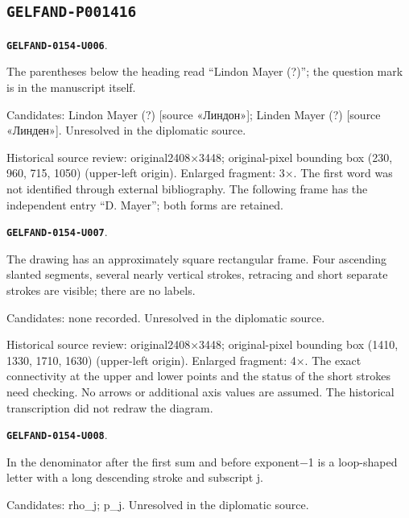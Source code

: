 \documentclass[11pt]{article}
\theoremstyle{definition}
\theoremstyle{remark}
\begin{document}
\subsection*{\texttt{GELFAND-P001416}}
\par\noindent\leavevmode{}\label{GELFAND-0154-U006}\label{GELFAND-P001416:mayer-name:note}\textbf{\texttt{GELFAND-0154-U006}}.\nopagebreak[4]\par
The parentheses below the heading read “Lindon Mayer (?)”; the question mark is in the manuscript itself.\par
Candidates: Lindon Mayer (?) [source «Линдон»]; Linden Mayer (?) [source «Линден»]. Unresolved in the diplomatic source.\par
Historical source review: original2408×3448; original-pixel bounding box (230, 960, 715, 1050) (upper-left origin). Enlarged fragment: 3×. The first word was not identified through external bibliography. The following frame has the independent entry “D. Mayer”; both forms are retained.\par\medskip
\par\noindent\leavevmode{}\label{GELFAND-0154-U007}\label{GELFAND-P001416:interval-graph:note}\textbf{\texttt{GELFAND-0154-U007}}.\nopagebreak[4]\par
The drawing has an approximately square rectangular frame. Four ascending slanted segments, several nearly vertical strokes, retracing and short separate strokes are visible; there are no labels.\par
Candidates: none recorded. Unresolved in the diplomatic source.\par
Historical source review: original2408×3448; original-pixel bounding box (1410, 1330, 1710, 1630) (upper-left origin). Enlarged fragment: 4×. The exact connectivity at the upper and lower points and the status of the short strokes need checking. No arrows or additional axis values are assumed. The historical transcription did not redraw the diagram.\par\medskip
\par\noindent\leavevmode{}\label{GELFAND-0154-U008}\label{GELFAND-P001416:slope-letter:note}\textbf{\texttt{GELFAND-0154-U008}}.\nopagebreak[4]\par
In the denominator after the first sum and before exponent−1 is a loop-shaped letter with a long descending stroke and subscript j.\par
Candidates: rho\_j; p\_j. Unresolved in the diplomatic source.\par
\end{document}
